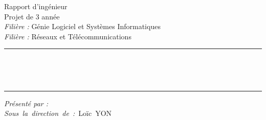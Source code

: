 \begin{center}


	\Large
	Rapport d'ingénieur													\\
	Projet de 3 année											\\
	\textit{Filière :} Génie Logiciel et Systèmes Informatiques			\\
	\textit{Filière :} Réseaux et Télécommunications
	
	\rule{16cm}{2pt}													\\
	\vspace*{0.35cm}
	
	\huge
	\textbf{\@title}													\\

	\rule{16cm}{2pt}
	

\end{center}
	
\vspace*{\fill}

\begin{multicols}{2}
	\vspace*{\fill}
	\begin{flushleft}
	
	
		\textit{Présenté par :} \@author									\\
		\mbox{\textit{Sous la direction de :} Loïc YON}
		
		
	\end{flushleft}
\columnbreak
	\vspace*{\fill}
	
	\begin{flushright}
	
		
		\@date
		
		
	\end{flushright}
\end{multicols}



\makeatother %
